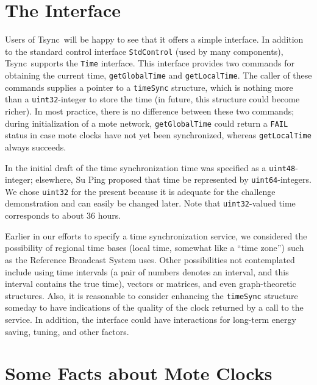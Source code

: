 \documentclass[11pt]{article}
\def\Tsync{\textsf{Tsync}}
\begin{document}
\section{The Interface}
Users of \Tsync\ will be happy to see that it offers a simple
interface.  In addition to the standard control interface 
\texttt{StdControl} (used by many components), \Tsync\ supports
the \texttt{Time} interface.  This interface provides two 
commands for obtaining the current time, \texttt{getGlobalTime} and
\texttt{getLocalTime}.  The caller of these commands supplies a
pointer to a \texttt{timeSync} structure, which is nothing more
than a \texttt{uint32}-integer to store the time (in future, this
structure could become richer).  In most practice, there is no difference
between these two commands;  during initialization of a mote network,
\texttt{getGlobalTime} could return a \texttt{FAIL} status in case
mote clocks have not yet been synchronized, whereas \texttt{getLocalTime}
always succeeds.
\par
In the initial draft of the time synchronization time was specified
as a \texttt{uint48}-integer;  elsewhere, Su Ping proposed that 
time be represented by \texttt{uint64}-integers.  We chose \texttt{uint32}
for the present because it is adequate for the challenge demonstration
and can easily be changed later.  Note that \texttt{uint32}-valued time
corresponds to about 36 hours. 
\par
Earlier in our efforts to specify a time synchronization service, we
considered the possibility of regional time bases (local time, somewhat
like a ``time zone'') such as the Reference Broadcast System 
\cite{elson} uses.  Other possibilities not contemplated include
using time intervals (a pair of numbers denotes an interval, and
this interval contains the true time), vectors or matrices, and even
graph-theoretic structures.  Also, it is reasonable to consider 
enhancing the \texttt{timeSync} structure someday to have indications
of the quality of the clock returned by a call to the service.  
In addition, the interface could have interactions for long-term
energy saving, tuning, and other factors.  

\section{Some Facts about Mote Clocks}
\end{document}
